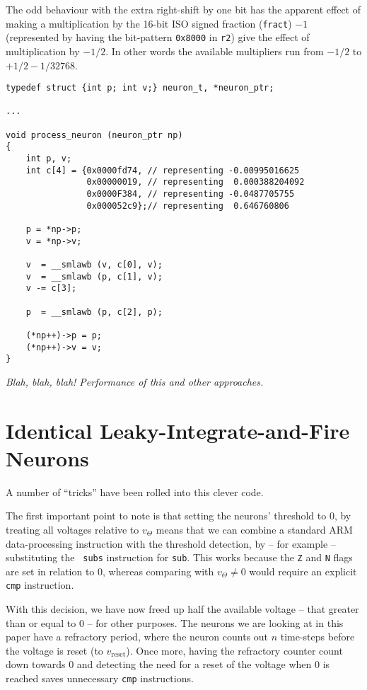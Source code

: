 The odd behaviour with the extra right-shift by one bit has the
apparent effect of making a multiplication by the 16-bit ISO signed
fraction ({\tt fract}) $-1$ (represented by having the bit-pattern
{\tt 0x8000} in {\tt r2}) give the effect of multiplication by
$-1/2$. In other words the available multipliers run from $-1/2$ to
$+1/2 - 1/32768$.

\begin{verbatim}
typedef struct {int p; int v;} neuron_t, *neuron_ptr;

...

void process_neuron (neuron_ptr np)
{
    int p, v;
    int c[4] = {0x0000fd74, // representing -0.00995016625
                0x00000019, // representing  0.000388204092
                0x0000F384, // representing -0.0487705755
                0x000052c9};// representing  0.646760806

    p = *np->p;
    v = *np->v;

    v  = __smlawb (v, c[0], v);
    v  = __smlawb (p, c[1], v);
    v -= c[3];

    p  = __smlawb (p, c[2], p);

    (*np++)->p = p;
    (*np++)->v = v;
}
\end{verbatim}

{\em Blah, blah, blah! Performance of this and other approaches.}

\section{Identical Leaky-Integrate-and-Fire Neurons}

A number of ``tricks'' have been rolled into this clever code.

The first important point to note is that setting the neurons'
threshold to $0$, by treating all voltages relative to $v_{\Theta}$
means that we can combine a standard ARM data-processing instruction
with the threshold detection, by -- for example -- substituting the {\tt
  subs} instruction for {\tt sub}. This works because the {\tt Z} and
{\tt N} flags are set in relation to $0$, whereas comparing with
$v_{\Theta}\not= 0$ would require an explicit {\tt cmp} instruction.

With this decision, we have now freed up half the available voltage --
that greater than or equal to $0$ -- for other purposes. The neurons
we are looking at in this paper have a refractory period, where the
neuron counts out $n$ time-steps before the voltage is reset (to
$v_{\mbox{reset}}$). Once more, having the refractory counter count
down towards $0$ and detecting the need for a reset of the voltage
when $0$ is reached saves unnecessary {\tt cmp} instructions.

